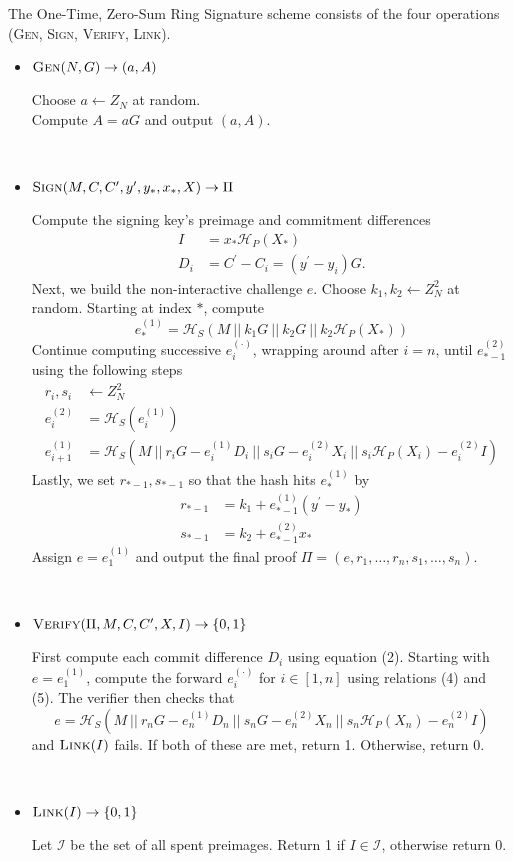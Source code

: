 \documentclass{article}
\newcommand{\algoname}[1]{\textnormal{\textsc{#1}}}
\newcommand{\gen}{\algoname{Gen}}
\newcommand{\sign}{\algoname{Sign}}
\newcommand{\verify}{\algoname{Verify}}
\newcommand{\link}{\algoname{Link}}
\newcommand{\sidx}{\ensuremath{*}}
\newcommand{\sx}{\ensuremath{x_\sidx}}
\newcommand{\ipk}{\ensuremath{X_i}}
\newcommand{\spk}{\ensuremath{X_\sidx}}
\newcommand{\iy}{\ensuremath{y_i}}
\newcommand{\sy}{\ensuremath{y_\sidx}}
\newcommand{\oy}{\ensuremath{y^\prime}}
\newcommand{\iC}{\ensuremath{C_i}}
\newcommand{\oC}{\ensuremath{C^\prime}}
\newcommand{\setI}{\ensuremath{\mathcal{I}}}
\newcommand{\hs}{\ensuremath{\mathcal{H}_S}}
\newcommand{\hp}{\ensuremath{\mathcal{H}_P}}
\begin{document}
The One-Time, Zero-Sum Ring Signature scheme consists of the four operations
({\gen}, {\sign}, {\verify}, {\link}).  
\begin{itemize}
  \item ${\gen}(N, G) \rightarrow (a, A)$

    Choose $a \leftarrow Z_N$ at random. \\
    Compute $A=aG$ and output $(a, A)$.

\ \\

  \item ${\sign}(M, C, {\oC}, {\oy}, {\sy}, {\sx}, X) \rightarrow \Pi $

    Compute the signing key's preimage and commitment differences
    \begin{align}
      I   &= {\sx} \hp({\spk}) \\
      D_i &= {\oC} - {\iC} = ({\oy} - {\iy}) G.
    \end{align}
    Next, we build the non-interactive challenge $e$.  Choose $k_1, k_2
    \leftarrow Z_N^2$ at random.  Starting at index $*$, compute
    \[ e_*^{(1)} = \hs(M ~ || ~ k_1 G ~ || ~ k_2 G ~ || ~ k_2 \hp(\spk) )\]
    Continue computing successive $e_i^{(\cdot)}$, wrapping around after $i=n$,
    until $e_{*-1}^{(2)}$ using the following steps 
    \begin{align} 
      r_i, s_i &\leftarrow Z_N^2 \\
      e_i^{(2)} &= \hs(e_i^{(1)}) \\
      e_{i+1}^{(1)} &= \hs(M ~ || ~ r_iG - e_i^{(1)}D_i ~ || ~ s_iG - e_i^{(2)}{\ipk} ~ || ~ s_i \hp({\ipk}) - e_i^{(2)}I)
    \end{align}
    Lastly, we set $r_{*-1}, s_{*-1}$ so that the hash hits $e_*^{(1)}$
    by
    \begin{align*}
      r_{*-1} &= k_1 + e_{*-1}^{(1)}({\oy} - {\sy}) \\
      s_{*-1} &= k_2 + e_{*-1}^{(2)}{\sx}
    \end{align*}
    Assign $e=e_1^{(1)}$ and output the final proof 
    $\Pi = (e, r_1, \dots, r_n, s_1, \dots, s_n)$.

\ \\

  \item ${\verify}(\Pi, M, C, {\oC}, X, I) \rightarrow \{0,1\} $

    First compute each commit difference $D_i$ using equation (2).  Starting
    with $e=e_1^{(1)}$, compute the forward $e_i^{(\cdot)}$ for $i \in [1, n]$
    using relations (4) and (5).  The verifier then checks that 
    \[e = \hs(M ~ 
    || ~ r_nG - e_n^{(1)}D_n ~ 
    || ~ s_nG - e_n^{(2)}X_n ~ 
    || ~ s_n \hp(X_n) - e_n^{(2)}I)\]
    and ${\link}(I)$ fails.  If both of these are met, return 1. Otherwise, return
    0.

\ \\

  \item $\link(I) \rightarrow \{0,1\}$

  Let {\setI} be the set of all spent preimages.  Return 1 if $I \in {\setI}$,
  otherwise return 0.
\end{itemize}
\end{document}
